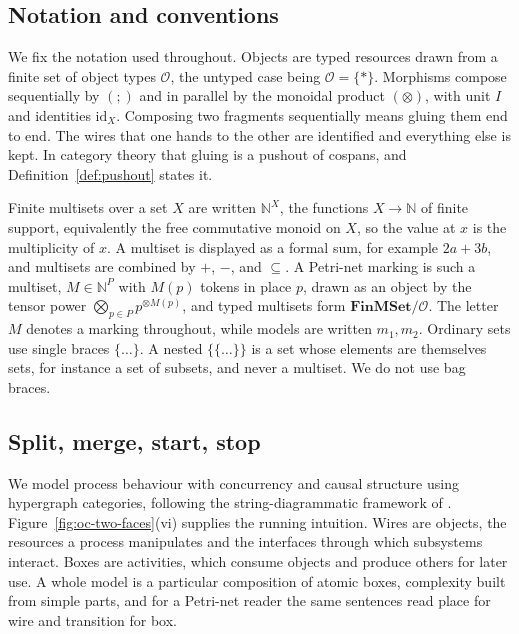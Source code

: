 \subsection{Notation and conventions}\label{subsec:conventions}

We fix the notation used throughout. Objects are typed resources drawn from a finite set of object
types $\mathcal{O}$, the untyped case being $\mathcal{O}=\{\ast\}$. Morphisms compose
sequentially by $(;)$ and in parallel by the monoidal product $(\otimes)$, with unit $I$ and
identities $\mathrm{id}_X$. Composing two fragments sequentially means gluing them end to end. The
wires that one hands to the other are identified and everything else is kept. In category theory that gluing
is a pushout of cospans, and Definition~\ref{def:pushout} states it.

Finite multisets over a set $X$ are written $\mathbb{N}^{X}$, the functions $X\to\mathbb{N}$ of
finite support, equivalently the free commutative monoid on $X$, so the value at $x$ is the
multiplicity of $x$. A multiset is displayed as a formal sum, for example $2a+3b$, and multisets
are combined by $+$, $-$, and $\subseteq$. A Petri-net marking is such a multiset,
$M\in\mathbb{N}^{P}$ with $M(p)$ tokens in place $p$, drawn as an object by the tensor power
$\bigotimes_{p\in P}p^{\otimes M(p)}$, and typed multisets form $\mathbf{FinMSet}/\mathcal{O}$. The
letter $M$ denotes a marking throughout, while models are written $m_1,m_2$. Ordinary sets use
single braces $\{\dots\}$. A nested $\{\{\dots\}\}$ is a set whose elements are themselves sets, for
instance a set of subsets, and never a multiset. We do not use bag braces.

\subsection{Split, merge, start, stop}

We model process behaviour with concurrency and causal structure using hypergraph
categories, following the string-diagrammatic framework of
\citet{bonchiStringDiagramRewrite2022,bonchiStringDiagramRewrite2022a,bonchiStringDiagramRewrite2022b}.
Figure~\ref{fig:oc-two-faces}(vi) supplies the running intuition. Wires are
objects, the resources a process manipulates and the interfaces through which
subsystems interact. Boxes are activities, which consume objects and produce
others for later use. A whole model is a particular composition of atomic
boxes, complexity built from simple parts, and for a Petri-net reader the same
sentences read place for wire and transition for box.

